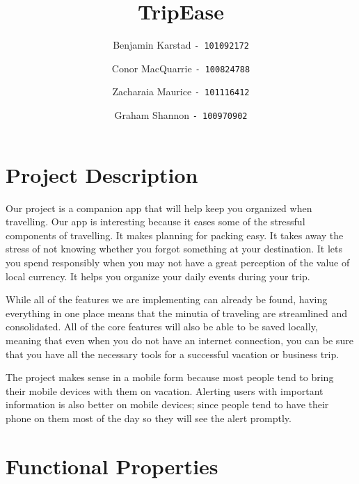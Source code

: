 \documentclass[12pt]{article}
\title{TripEase}
\author{
Benjamin Karstad
\texttt{- 101092172}
\and
Conor MacQuarrie
\texttt{- 100824788}
\and
Zacharaia Maurice
\texttt{- 101116412}
\and
Graham Shannon
\texttt{- 100970902}
}
\begin{document}
	\maketitle

	\section*{Project Description}

	Our project is a companion app that will help keep you organized when travelling.
	Our app is interesting because it eases some of the stressful components of travelling.
	It makes planning for packing easy.
	It takes away the stress of not knowing whether you forgot something at your destination.
	It lets you spend responsibly when you may not have a great perception of the value of local currency.
	It helps you organize your daily events during your trip.

	While all of the features we are implementing can already be found,
	having everything in one place means that the minutia of traveling are streamlined and consolidated.
	All of the core features will also be able to be saved locally, meaning that even when you do not have an internet connection,
	you can be sure that you have all the necessary tools for a successful vacation or business trip.

	The project makes sense in a mobile form because most people tend to bring their mobile devices with them on vacation.
	Alerting users with important information is also better on mobile devices;
	since people tend to have their phone on them most of the day so they will see the alert promptly.

	\pagebreak

	\section*{Functional Properties}
\end{document}

